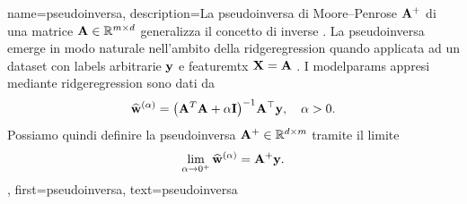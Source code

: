 
{name={pseudoinversa},
  description={La  pseudoinversa di Moore–Penrose ${\bf A}^{+}$ 
 di una matrice ${\bf A} \in \mathbb{R}^{m \times d}$ generalizza il 
 concetto di \gls{inverse} \cite{GolubVanLoanBook}. La pseudoinversa emerge in modo naturale 
 nell’ambito della \gls{ridgeregression} quando applicata ad un \gls{dataset} con \glspl{label} arbitrarie ${\bf y}$ 
 e \gls{featuremtx} ${\bf X} = {\bf A}$ \cite[Ch.\ 3]{hastie01statisticallearning}. I \glspl{modelparam} 
 appresi mediante \gls{ridgeregression} 
  sono dati da
  	\[
  	\widehat{{\bf w}}^{(\alpha)}  = \big({\bf A}^T {\bf A} + \alpha \mathbf{I} \big)^{-1} {\bf A}^\top {\bf y}, \quad \alpha > 0.
  	\]
  	Possiamo quindi definire la pseudoinversa  ${\bf A}^+ \in \mathbb{R}^{d \times m}$ tramite 
  	il limite \cite[Ch. 3]{benisrael2003generalized}
  	\[
  	\lim_{\alpha \to 0^+} \widehat{{\bf w}}^{(\alpha)} = {\bf A}^+ {\bf y}.
  	\]
	},
 	first={pseudoinversa},
 	text={pseudoinversa}
 }
 

